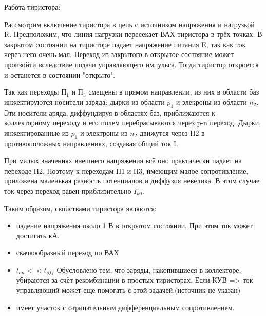 \begin{center}
	\begin{figure}[h!]
		\caption{}	
	\end{figure}
\end{center}

Работа тиристора:
\begin{center}
	\begin{figure}[h!]
		\caption{}	
	\end{figure}
\end{center}

Рассмотрим включение тиристора в цепь с источником напряжения и нагрузкой R. Предположим, что линия нагрузки пересекает ВАХ тиристора в трёх точках. В закрытом состоянии на тиристоре падает напряжение питания E, так как ток через него очень мал. Переход из закрытого в открытое состояние может произойти вследствие подачи управляющего импульса. Тогда тиристор откроется и останется в состоянии "открыто".

Так как переходы П$_1$ и П$_3$ смещены в прямом направлении, из них в области баз инжектируются носители заряда: дырки из области $p_1$ и элекроны из области $n_2$. Эти носители аряда, диффундируя в областях баз, приближаются к коллекторному переходу и его полем перебрасываются через p-n переход. Дырки, инжектированные из $p_1$ и электроны из $n_2$ движутся через П2 в противоположных направлениях, создавая общий ток I.

При малых значениях внешнего напряжения всё оно практически падает на переходе П2. Поэтому к переходам П1 и П3, имеющим малое сопротивление, приложена маленькая разность потенциалов и диффузия невелика. В этом случае ток через переход равен приблизительно $I_{k0}$. 

Таким образом, свойствами тиристора являются:
\begin{itemize}
\item падение напряжения около 1 В в открытом состоянии. При этом ток может достигать кА.
\item скачкообразный переход по ВАХ
\item $t_{on} << t_{off}$ Обусловлено тем, что заряды, накопившиеся в коллекторе, убираются за счёт рекомбинации в простых тиристорах. Если КУВ => ток управляющий может еще помогать с этой задачей.(источник не указан)
\item имеет участок с отрицательным дифференциальным сопротивлением.

\end{itemize}

